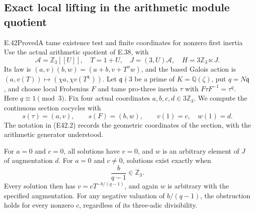 \subsection{Exact local lifting in the arithmetic module quotient}

\begin{statement}{E.42}{Proved}{A tame existence test and finite coordinates for nonzero first inertia}
Use the actual arithmetic quotient of E.38, with
\[
 \mathscr A=\mathbb Z_3[[U]],\quad T=1+U,\quad
 J=(3,U)\mathscr A,\quad H=3\mathbb Z_3\ltimes J.
 \tag{E42.1}
\]
Its law is $(a,v)(b,w)=(a+b,v+T^aw)$, and the based
Galois action is $(a,v(T))\mapsto
(\chi a,\chi v(T^\chi))$. Let $\mathfrak q\nmid3$ be
a prime of $K=\mathbb Q(\zeta)$, put $q=N\mathfrak q$,
and choose local Frobenius $F$ and tame pro-three inertia
$\tau$ with $F\tau F^{-1}=\tau^q$. Here $q\equiv1\pmod3$.
Fix four actual coordinates $a,b,c,d\in3\mathbb Z_3$.
We compute the continuous section cocycles with
\[
 s(\tau)=(a,v),\qquad s(F)=(b,w),\qquad
 v(1)=c,\quad w(1)=d.
 \tag{E42.2}
\]
The notation in (E42.2) records the geometric coordinates
of the section, with the arithmetic generator understood.

For $a=0$ and $c=0$, all solutions have $v=0$, and
$w$ is an arbitrary element of $J$ of augmentation $d$.
For $a=0$ and $c\ne0$, solutions exist exactly when
\[
             \frac{b}{q-1}\in\mathbb Z_3.
 \tag{E42.3}
\]
Every solution then has
$v=cT^{-b/(q-1)}$, and again $w$ is arbitrary with the
specified augmentation. For any negative valuation of
$b/(q-1)$, the obstruction holds for every nonzero $c$,
regardless of its three-adic divisibility.


\end{statement}
